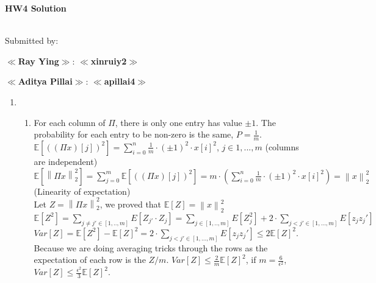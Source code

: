 \documentclass[11pt]{article}%
\newcommand{\norm}[1]{\left\lVert#1\right\rVert}
\begin{document}
\noindent\textbf{\LARGE HW{4} Solution}\\
\noindent{\textbf{\Course: \CourseName, \Semester}}
\hfill{}%
\\[-0.12cm]
%
\Hr%
\smallskip%

\noindent%
Submitted by:
\begin{compactitem}
    \item \textbf{$\ll$Ray Ying$\gg$}:
    \textbf{$\ll$xinruiy2$\gg$}
    \item \textbf{$\ll$Aditya Pillai$\gg$}:
    \textbf{$\ll$apillai4$\gg$}
\end{compactitem}
\Hr
\medskip
\SaveIndent%

\begin{questions}[1]
\item 
\begin{enumerate}
    \item   
        \begin{enumerate}
            \item For each column of $\Pi$, there is only one entry has value $\pm 1$. The probability for each entry to be non-zero is the same, $P = \frac{1}{m}$.\\ 
            $\mathbb{E}[((\Pi x)[j])^2] = \sum_{i = 0}^{n} \frac{1}{m} \cdot (\pm 1)^2 \cdot x[i]^2 $, $j \in {1, ... ,m}$ (columns are independent)\\
            $\mathbb{E}[\norm{\Pi x}_2^2] = \sum_{j = 0}^{m} \mathbb{E}[((\Pi x)[j])^2] = m \cdot ( \sum_{i = 0}^{n} \frac{1}{m} \cdot (\pm 1)^2 \cdot x[i]^2) = \norm{x}_2^2$ (Linearity of expectation)\\
        
            Let $Z = \norm{\Pi x}_2^2$, we proved that $\mathbb{E}[Z] = \norm{x}_2^2$ \\
            
            $\mathbb{E}[Z^2] = \sum_{j \neq j' \in [1,..,m]} E[Z_{j'}\cdot Z_j] = \sum_{j \in [1,..,m]} E[Z_j^2] + 2 \cdot \sum_{j<j' \in [1,...,m]}E[z_jz_j']$\\
            
            $Var[Z] = \mathbb{E}[Z^2] - \mathbb{E}[Z]^2 = 2 \cdot \sum_{j<j' \in [1,...,m]}E[z_jz_j'] \leq 2 \mathbb{E}[Z]^2$. Because we are doing averaging tricks through the rows as the expectation of each row is the $Z/m$. $Var[Z] \leq \frac{2}{m}\mathbb{E}[Z]^2$, if $m = \frac{6}{\epsilon^2}$, $Var[Z] \leq \frac{\epsilon^2}{3}\mathbb{E}[Z]^2$. \\
            

\end{enumerate}
\end{enumerate}
\end{questions}
\end{document}
